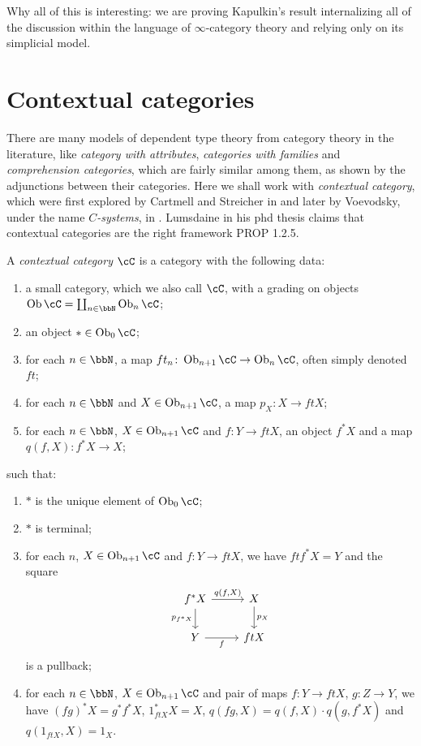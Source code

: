 \documentclass[a4paper,fontsize=12pt]{scrartcl}
\begin{document}
Why all of this is interesting: we are proving Kapulkin's result internalizing
all of the discussion within the language of $\infty$-category theory and
relying only on its simplicial model.

\section{Contextual categories}

There are many models of dependent type theory from category theory in
the literature, like \emph{category with attributes}, \emph{categories with
families} and \emph{comprehension categories}, which are
fairly similar among them, as shown by the adjunctions between their categories.
Here we shall work with \emph{contextual
category}, which were first explored by Cartmell and Streicher in
 and later by Voevodsky, under the name $C$\emph{-systems},
in . Lumsdaine in his phd thesis claims that contextual
categories are the right framework PROP 1.2.5.

\begin{defn}
  A \emph{contextual category} $\cC$ is a category with the following data:
  \begin{enumerate}
    \item a small category, which we also call $\cC$, with a grading on objects
      $\Ob\cC=\coprod_{n\in\bbN}\Ob_n\cC$;
    \item an object $*\in\Ob_0\cC$;
    \item for each $n\in\bbN$, a map
      $ft_n\colon\Ob_{n+1}\cC\rightarrow\Ob_n\cC$, often simply denoted $ft$;
    \item for each $n\in\bbN$ and $X\in\Ob_{n+1}\cC$, a map $p_X\colon
      X\rightarrow ftX$;
    \item for each $n\in\bbN$, $X\in\Ob_{n+1}\cC$ and $f\colon Y\rightarrow
      ftX$, an object $f^*X$ and a map $q(f,X)\colon f^*X\rightarrow X$;
  \end{enumerate}
  such that:
  \begin{enumerate}
    \item $*$ is the unique element of $\Ob_0\cC$;
    \item $*$ is terminal;
    \item for each $n$, $X\in\Ob_{n+1}\cC$ and $f\colon Y\rightarrow ftX$, we
      have $ft f^*X=Y$ and the square
      \[\begin{tikzcd}
        {f^*X} & X \\
        Y & ftX
        \arrow["f"', from=2-1, to=2-2]
        \arrow["{p_X}", from=1-2, to=2-2]
        \arrow["{q(f,X)}", from=1-1, to=1-2]
        \arrow["{p_{f^*X}}"', from=1-1, to=2-1]
      \end{tikzcd}\]
      is a pullback;
    \item for each $n\in\bbN$, $X\in\Ob_{n+1}\cC$ and pair of maps $f\colon
      Y\rightarrow ft X$, $g\colon Z\rightarrow Y$, we have $(fg)^*X=g^*f^*X$,
      $1^*_{ftX}X=X$, $q(fg,X)=q(f,X)\cdot q(g,f^*X)$ and $q(1_{ftX},X)=1_X$.
  \end{enumerate}
\end{defn}
\end{document}
